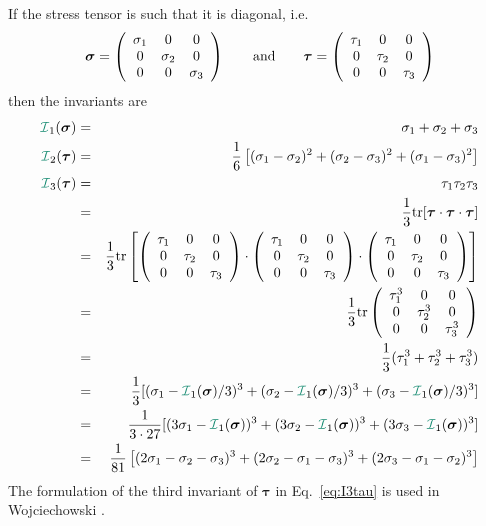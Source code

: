 If the stress tensor is such that it is diagonal, i.e.
\[
{\bm \sigma}= \left( \begin{array}{ccc}
\sigma_1 & 0 & 0 \\
0 & \sigma_2 & 0 \\
0 & 0 & \sigma_3
\end{array}\right)
\qquad
{\rm and}
\qquad
{\bm \tau}= \left( \begin{array}{ccc}
\tau_1 & 0 & 0 \\
0 & \tau_2 & 0 \\
0 & 0 & \tau_3
\end{array}\right)
\]
then the invariants are 
\begin{eqnarray}
{\III}_1({\bm \sigma}) &=& \sigma_1 + \sigma_2+ \sigma_3 \nonumber\\
{\III}_2({\bm \tau}) &=& \frac{1}{6}\left[(\sigma_{1}-\sigma_{2})^2 + (\sigma_{2}-\sigma_{3})^2 
+ (\sigma_{1}-\sigma_{3})^2 \right] \\ 
{\III}_3({\bm \tau}) 
&=& \tau_1\tau_2\tau_3 \nn\\
&=& \frac{1}{3} {\rm tr}[{\bm \tau}\cdot{\bm \tau}\cdot {\bm \tau}]  \nn\\
&=& \frac{1}{3} {\rm tr}
\left[
\left(
\begin{array}{ccc}
\tau_1 & 0 & 0 \\
0 & \tau_2 & 0 \\
0 & 0 & \tau_3 
\end{array}
\right)
\cdot
\left(
\begin{array}{ccc}
\tau_1 & 0 & 0 \\
0 & \tau_2 & 0 \\
0 & 0 & \tau_3 
\end{array}
\right)
\cdot
\left(
\begin{array}{ccc}
\tau_1 & 0 & 0 \\
0 & \tau_2 & 0 \\
0 & 0 & \tau_3 
\end{array}
\right)
\right] \nn\\
&=&  \frac{1}{3} {\rm tr}
\left(
\begin{array}{ccc}
\tau_1^3 & 0 & 0 \\
0 & \tau_2^3 & 0 \\
0 & 0 & \tau_3^3 
\end{array}
\right) \nn\\
&=& \frac{1}{3}(\tau_1^3+\tau_2^3+\tau_3^3) \nn\\
&=&  \frac{1}{3} [ 
(\sigma_1-{\III}_1({\bm \sigma})/3)^3+  
(\sigma_2-{\III}_1({\bm \sigma})/3)^3+
(\sigma_3-{\III}_1({\bm \sigma})/3)^3 ]   \nonumber\\ 
&=&  \frac{1}{3\cdot 27} [ 
(3\sigma_1-{\III}_1({\bm \sigma}))^3+  
(3\sigma_2-{\III}_1({\bm \sigma}))^3+
(3\sigma_3-{\III}_1({\bm \sigma}))^3 ]   \nonumber\\ 
&=& \frac{1}{81}
\left[
(2\sigma_1-\sigma_2-\sigma_3)^3+
(2\sigma_2-\sigma_1-\sigma_3)^3+
(2\sigma_3-\sigma_1-\sigma_2)^3
\right] 
\label{eq:3rdinvb} \label{eq:I3tau}
\end{eqnarray}
The formulation of the third invariant of ${\bm \tau}$  in Eq.~\ref{eq:I3tau} 
is used in Wojciechowski \cite{wojc18}.











